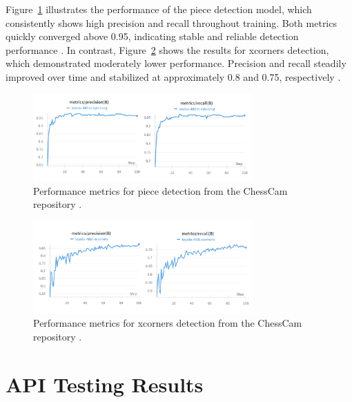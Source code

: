 Figure~\ref{fig:chesscam-piece-metrics} illustrates the performance of the piece detection model, which consistently shows high precision and recall throughout training. Both metrics quickly converged above 0.95, indicating stable and reliable detection performance \cite{wandb:piece-detection}. In contrast, Figure~\ref{fig:chesscam-xcorners-metrics} shows the results for xcorners detection, which demonstrated moderately lower performance. Precision and recall steadily improved over time and stabilized at approximately 0.8 and 0.75, respectively \cite{wandb:xcorner-detection}.

\begin{figure}[H]
\centering
\includegraphics[width=0.75\textwidth]{figures/results/machine-learning/piece-metrics.png}
\caption[Performance piece detection (ChessCam)]{Performance metrics for piece detection from the ChessCam repository \cite{wandb:piece-detection}.}
\label{fig:chesscam-piece-metrics}
\end{figure}

\begin{figure}[H]
\centering
\includegraphics[width=0.75\textwidth]{figures/results/machine-learning/xcorners-metrics.png}
\caption[Performance xcorners detection (ChessCam)]{Performance metrics for xcorners detection from the ChessCam repository \cite{wandb:xcorner-detection}.}
\label{fig:chesscam-xcorners-metrics}
\end{figure}

\section{API Testing Results}

